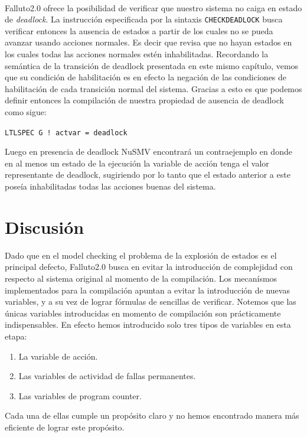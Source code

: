 \documentclass[titlepage, 12pt]{book}
\begin{document}
~\\

Falluto2.0 ofrece la posibilidad de verificar que nuestro sistema no caiga en estado de \textit{deadlock}. La instrucci\'on especificada por la sintaxis \texttt{CHECKDEADLOCK} busca verificar entonces la ausencia de estados a partir de los cuales no se pueda avanzar usando acciones normales. Es decir que revisa que no hayan estados en los cuales todas las acciones normales est\'en inhabilitadas. Recordando la sem\'antica de la transici\'on de deadlock presentada en este mismo cap\'itulo, vemos que su condici\'on de habilitaci\'on es en efecto la negaci\'on de las condiciones de habilitaci\'on de cada transici\'on normal del sistema. Gracias a esto es que podemos definir entonces la compilaci\'on de nuestra propiedad de ausencia de deadlock como sigue:
\begin{center}
\texttt{LTLSPEC~G~!~actvar = deadlock}
\end{center}
Luego en presencia de deadlock NuSMV encontrar\'a un contraejemplo en donde en al menos un estado de la ejecuci\'on la variable de acci\'on tenga el valor representante de deadlock, sugiriendo por lo tanto que el estado anterior a este pose\'ia inhabilitadas todas las acciones buenas del sistema.

\section{Discusi\'on}

Dado que en el model checking el problema de la explosi\'on de estados es el principal defecto, Falluto2.0 busca en evitar la introducci\'on de complejidad con respecto al sistema original al momento de la compilaci\'on. Los mecan\'ismos implementados para la compilaci\'on apuntan a evitar la introducci\'on de nuevas variables, y a su vez de lograr f\'ormulas de sencillas de verificar. Notemos que las \'unicas variables introducidas en momento de compilaci\'on son pr\'acticamente indispensables. En efecto hemos introducido solo tres tipos de variables en esta etapa: 
\begin{enumerate}
\item La variable de acci\'on.
\item Las variables de actividad de fallas permanentes.
\item Las variables de program counter.
\end{enumerate}
Cada una de ellas cumple un prop\'osito claro y no hemos encontrado manera m\'as eficiente de lograr este prop\'osito.
\end{document}
